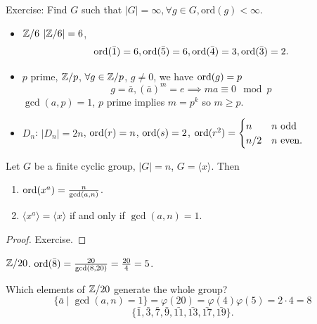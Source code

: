 \documentclass[10pt, a4paper]{article}
\begin{document}
Exercise:
Find $G$ such that $|G| = \infty, \forall g \in G, \mathrm{ord}(g) < \infty$.

\begin{example}
    \begin{itemize}
        \item $\mathbb{Z} / 6$ $|\mathbb{Z} / 6| = 6$,
        \[
        \operatorname{ord}(\bar{1}) = 6, \operatorname{ord}(\bar{5}) = 6, \operatorname{ord}(\bar{4}) = 3, \operatorname{ord}(\bar{3}) = 2.
        \]

        \item $p$ prime,
        $\mathbb{Z} / p$,
        $\forall g \in \mathbb{Z} / p$,
        $g \neq 0$,
        we have $\operatorname{ord}(g) = p$
        \[
        g = \bar{a}, (\bar{a}) ^ m = e \implies ma \equiv 0\mod{p}
        \]
        $\gcd(a, p) = 1$,
        $p$ prime implies $m = p ^ k$ so $m \geq p$.

        \item $D_n$:
        $|D_n| = 2n$,
        $\operatorname{ord}(r) = n$,
        $\operatorname{ord}(s) = 2$,
        $\operatorname{ord}(r ^ 2) = \begin{cases}
            n &\text{$n$ odd} \\
            n / 2 &\text{$n$ even}.
        \end{cases}$
    \end{itemize}
\end{example}

\begin{lemma}
    Let $G$ be a finite cyclic group,
    $|G| = n$,
    $G = \langle x\rangle$.
    Then
    \begin{enumerate}[label = (\roman*)]
        \item $\operatorname{ord}(x ^ a) = \frac{n}{\gcd(a, n)}$.

        \item $\langle x ^ a\rangle = \langle x\rangle$ if and only if $\gcd(a, n) = 1$.
    \end{enumerate}

    \begin{proof}
        Exercise.
    \end{proof}
\end{lemma}

\begin{example}
    $\mathbb{Z} / 20$.
    $\operatorname{ord}(\bar{8}) = \frac{20}{\gcd(8, 20)} = \frac{20}{4} = 5$.
    
    Which elements of $\mathbb{Z} / 20$ generate the whole group?
    \[
    \{\bar{a} \mid \gcd(a, n) = 1\} = \varphi(20) = \varphi(4)\varphi(5) = 2 \cdot 4 = 8
    \]
    \[
    \{\bar{1}, \bar{3}, \bar{7}, \bar{9}, \bar{11}, \bar{13}, \bar{17}, \bar{19}\}.
    \]
\end{example}
\end{document}
